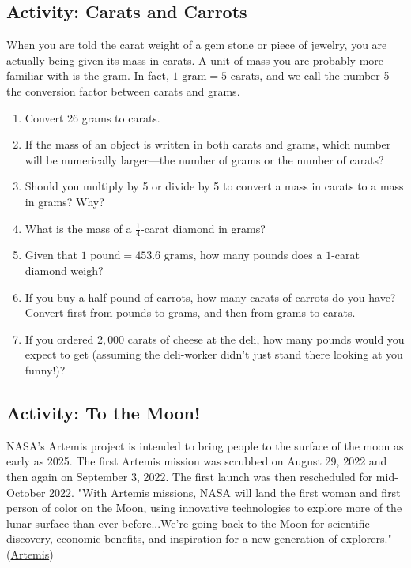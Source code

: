 \subsection{Activity: Carats and Carrots}
When you are told the carat weight of a gem stone or piece of jewelry, you are actually being given its mass in carats. A unit of mass you are probably more familiar with is the gram. In fact, $1\text{ gram}=5\text{ carats}$, and we call the number 5 the conversion factor between carats and grams. 
\begin{enumerate}
\item Convert 26 grams to carats. \wbvfill
\item If the mass of an object is written in both carats and grams, which number will be numerically larger---the number of grams or the number of carats? \wbvfill
\item Should you multiply by 5 or divide by 5 to convert a mass in carats to a mass in grams? Why?  \wbvfill
\item What is the mass of a $\frac{1}{4}$-carat diamond in grams? \wbvfill
\item \label{enu:pounds-grams}Given that $1\text{ pound}=453.6\text{ grams}$, how many pounds does a $1$-carat diamond weigh? \wbvfill
\item If you buy a half pound of carrots, how many carats of carrots do you have? Convert first from pounds to grams, and then from grams to carats. \wbvfill
\item If you ordered $2,000$ carats of cheese at the deli, how many pounds would you expect to get (assuming the deli-worker didn't just stand there looking at you funny!)? \wbvfill\wbnewpage
\end{enumerate}

\subsection{Activity: To the Moon!}
NASA's Artemis project is intended to bring people to the surface of the moon as early as 2025. The first Artemis mission was scrubbed on August 29, 2022 and then again on September 3, 2022. The first launch was then rescheduled for mid-October 2022. "With Artemis missions, NASA will land the first woman and first person of color on the Moon, using innovative technologies to explore more of the lunar surface than ever before...We’re going back to the Moon for scientific discovery, economic benefits, and inspiration for a new generation of explorers." (\href{https://www.nasa.gov/specials/artemis/}{Artemis})

